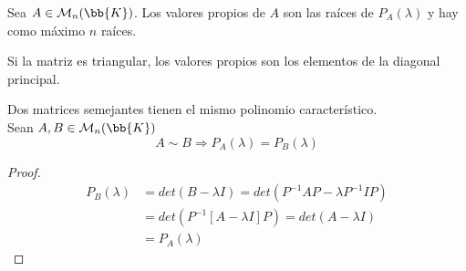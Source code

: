 \begin{definicion}
    Sea $A\in\mathcal{M}_n(\bb{K})$. Los valores propios de $A$ son las raíces de $P_A(\lambda)$ y hay como máximo $n$ raíces.
\end{definicion}

\begin{observacion}
    Si la matriz es triangular, los valores propios son los elementos de la diagonal principal.
\end{observacion}

\begin{prop}
    Dos matrices semejantes tienen el mismo polinomio característico.\\
    Sean $A,B\in\mathcal{M}_n(\bb{K})$
    \begin{equation*}
        A \sim B \Longrightarrow P_A(\lambda) = P_B(\lambda)
    \end{equation*}
\end{prop}
\begin{proof}
    \begin{equation*}\begin{split}
        P_B(\lambda) & = det(B-\lambda I) = det(P^{-1}AP - \lambda P^{-1}IP)\\
        & = det(P^{-1}[A-\lambda I]P) = det(A-\lambda I)\\ & = P_A(\lambda)
    \end{split}\end{equation*}
\end{proof}
